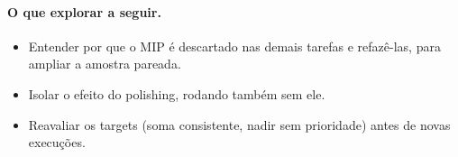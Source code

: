 \documentclass[11pt,a4paper]{article}
\begin{document}
\paragraph{O que explorar a seguir.}
\begin{itemize}[leftmargin=*]
  \item Entender por que o MIP é descartado nas demais tarefas e refazê-las, para ampliar a
  amostra pareada.
  \item Isolar o efeito do polishing, rodando também sem ele.
  \item Reavaliar os targets (soma consistente, nadir sem prioridade) antes de novas execuções.
\end{itemize}
\end{document}
